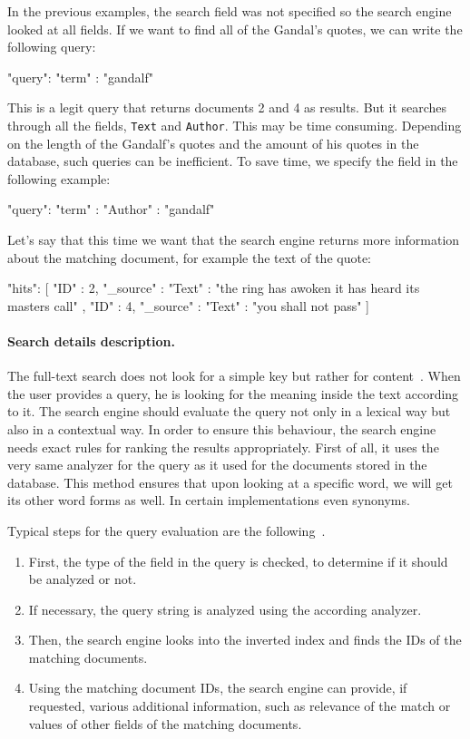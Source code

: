 In the previous examples, the search field was not specified so the search engine looked at all fields. If we want to find all of the Gandal's quotes, we can write the following query:
\begin{code}
{ "query": { 
    "term" : "gandalf"
} }
\end{code}
This is a legit query that returns documents 2 and 4 as results. But it searches through all the fields, \texttt{Text} and \texttt{Author}. This may be time consuming. Depending on the length of the Gandalf's quotes and the amount of his quotes in the database, such queries can be inefficient. 
To save time, we specify the field in the following example:
\begin{code}
{ "query": { 
    "term" : {
        "Author" : "gandalf"
} } }
\end{code}
Let's say that this time we want that the search engine returns more information about the matching document, for example the text of the quote:
 \begin{code}
{ "hits": [ { 
      "ID" : 2,
      "_source" : {
        "Text"  : "the ring has awoken it has heard its
                        masters call" 
      } }, { 
      "ID" : 4,
      "_source" : {
        "Text"  : "you shall not pass" 
} } ] }
\end{code}

\paragraph{Search details description.}
The full-text search does not look for a simple key but rather for content~\cite{invertedfiles}. When the user provides a query, he is looking for the meaning inside the text according to it. The search engine should evaluate the query not only in a lexical way but also in a contextual way. In order to ensure this behaviour, the search engine needs exact rules for ranking the results appropriately. First of all, it uses the very same analyzer for the query as it used for the documents stored in the database.
This method ensures that upon looking at a specific word, we will get its other word forms as well. In certain implementations even synonyms.

Typical steps for the query evaluation are the following~\cite{elastic}. 
\begin{enumerate}
\item First, the type of the field in the query is checked, to determine if it should be analyzed or not.
\item If necessary, the query string is analyzed using the according analyzer.
\item Then, the search engine looks into the inverted index and finds the IDs of the matching documents.
\item Using the matching document IDs, the search engine can provide, if requested, various additional information, such as relevance of the match or values of other fields of the matching documents.
\end{enumerate}

